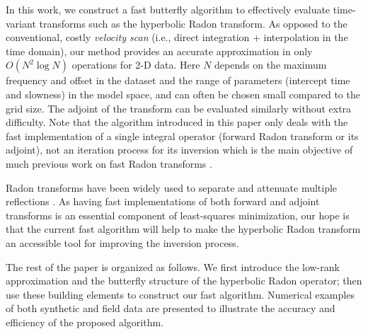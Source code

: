 In this work, we construct a fast butterfly algorithm to effectively evaluate time-variant transforms such as the hyperbolic Radon transform. As opposed to the conventional, costly {\it velocity scan} (i.e., direct integration + interpolation in the time domain), our method provides an accurate approximation in only $O(N^2\log N)$ operations for 2-D data. Here $N$ depends on the maximum frequency and offset in the dataset and the range of parameters (intercept time and slowness) in the model space, and can often be chosen small compared to the grid size. The adjoint of the transform can be evaluated similarly without extra difficulty. Note that the algorithm introduced in this paper only deals with the fast implementation of a single integral operator (forward Radon transform or its adjoint), not an iteration process for its inversion which is the main objective of much previous work on fast Radon transforms .

Radon transforms have been widely used to separate and attenuate multiple reflections \citep{Hampson86, Yilmaz89, FM92, Herrmann00, MK02, Hargreaves03, Trad03}. As having fast implementations of both forward and adjoint transforms is an essential component of least-squares minimization, our hope is that the current fast algorithm will help to make the hyperbolic Radon transform an accessible tool for improving the inversion process.


The rest of the paper is organized as follows. We first introduce the low-rank approximation and the butterfly structure of the hyperbolic Radon operator; then use these building elements to construct our fast algorithm.  Numerical examples of both synthetic and field data are presented to illustrate the accuracy and efficiency of the proposed algorithm.


